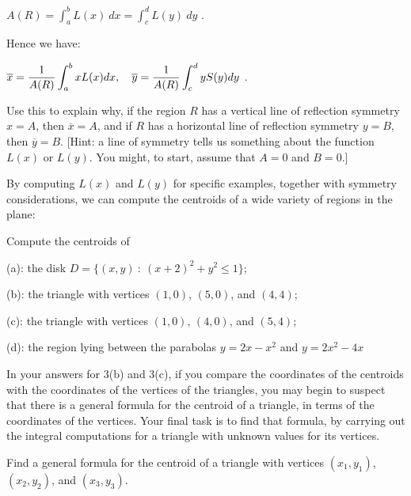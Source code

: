 \smallskip

\centerline{$\displaystyle A(R) = \int_a^b L(x)\ dx = \int_c^d L(y)\ dy$ .}

\smallskip

\noindent Hence we have:

\smallskip

\centerline{$\displaystyle\overline{x}= \frac{1}{A(R)} \int_{a}^b   xL(x) dx, \quad \overline{y}= \frac{1}{A(R)}\int_{c}^d  y S(y) dy$ .}

\smallskip

\noindent Use this to explain why, if the region $R$ has a vertical line of reflection
symmetry $x=A$, then $\overline{x}=A$, and if 
$R$ has a horizontal line of reflection symmetry $y=B$, then
$\overline{y}=B$. [Hint: a line of symmetry tells us something 
about the function $L(x)$ or $L(y)$. You might, to start, assume that $A=0$ and $B=0$.] 

\medskip

By computing $L(x)$ and $L(y)$ for specific examples, together with symmetry considerations,
we can compute the centroids of a wide variety of regions in the plane:

\medskip

 Compute the centroids of 

\smallskip

(a): the disk $D=\{(x,y)\ :\ (x+2)^2+y^2\leq 1\}$;

(b): the triangle with vertices $(1,0)$, $(5,0)$, and $(4,4)$;

(c): the triangle with vertices $(1,0)$, $(4,0)$, and $(5,4)$;

(d): the region lying between the parabolas $y=2x-x^2$ and $y=2x^2-4x$

\smallskip


\medskip

In your answers for 3(b) and 3(c), if you compare the coordinates of the
centroids with the coordinates of the
vertices of the triangles, you may begin to suspect that there is a 
general formula for the centroid of a triangle, in terms of the 
coordinates of the vertices. Your final task is to find that formula,
by carrying out the integral computations for a triangle with
unknown values for its vertices.

\medskip

 Find a 
general formula for the centroid of
a triangle with vertices $(x_1,y_1)$, $(x_2,y_2)$, and $(x_3,y_3)$. 

